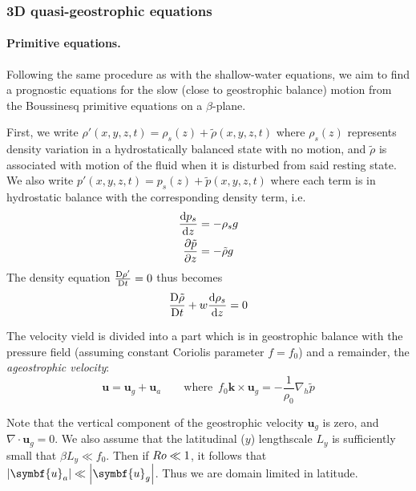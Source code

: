 \documentclass{jknotes}
\begin{document}
\subsubsection{3D quasi-geostrophic equations}
\paragraph{Primitive equations.} Following the same procedure as with the
shallow-water equations, we aim to find a prognostic equations for the slow
(close to geostrophic balance) motion from the Boussinesq primitive equations
on a $\beta$-plane.

First, we write $\rho'(x,y,z,t) = \rho_s(z) + \tilde{\rho}(x,y,z,t)$ where
$\rho_s(z)$ represents density variation in a hydrostatically balanced state
with no motion, and $\tilde{\rho}$ is associated with motion of the fluid when
it is disturbed from said resting state. We also write $p'(x,y,z,t) = p_s(z) +
\tilde{p}(x,y,z,t)$ where each term is in hydrostatic balance with the
corresponding density term, i.e.
\begin{align}
	\frac{\diffd p_s}{\diffd z} &= -\rho_s g \\
	\frac{\partial \tilde{p}}{\partial z} &= - \tilde{\rho} g
\end{align}
The density equation $\frac{\mathrm{D} \rho'}{\mathrm{D} t} = 0$ thus becomes
\begin{equation}
	\frac{\diffD \tilde{\rho}}{\diffD t} + w \frac{\diffd \rho_s}{\diffd z} =
	0
\end{equation}

The velocity vield is divided into a part which is in geostrophic balance with
the pressure field (assuming constant Coriolis parameter $f=f_0$) and a remainder, the
\emph{ageostrophic velocity}:
\begin{equation}
	\symbf{u} = \symbf{u}_g + \symbf{u}_a \hspace{2em} \text{where} \,\,\, f_0 \symbf{k}
	\times \symbf{u}_g = -\frac{1}{\rho_0} \nabla_h \tilde{p}
\end{equation}

Note that the vertical component of the geostrophic velocity $\symbf{u}_g$ is
zero, and $\nabla \cdot \symbf{u}_g = 0$. We also assume that the latitudinal
($y$) lengthscale $L_y$ is sufficiently small that $\beta L_y \ll f_0$. Then
if $Ro \ll 1$, it follows that $\abs{\symbf{u}_a} \ll \abs{\symbf{u}_g}$.
Thus we are domain limited in latitude.
\end{document}
